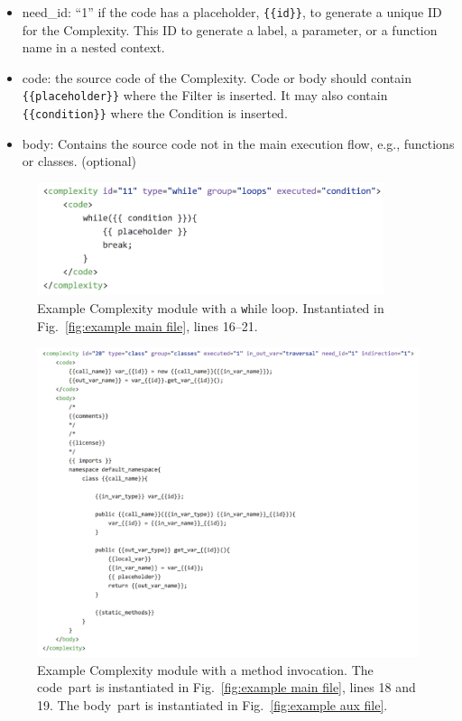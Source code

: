 \documentclass[12pt]{article}
\begin{document}
\begin{itemize}
    \item need\_id: ``1'' if the code has a placeholder, \verb|{{id}}|,
    to generate a unique ID for the Complexity.  This ID to generate 
    a label, a parameter, or a function name in a nested
    context.

    \item code: the source code of the Complexity.  Code or 
    body should contain \\ \verb|{{placeholder}}|
    where the Filter is inserted.  It may also contain
    \verb|{{condition}}| where the Condition
    is inserted.

    \item body:  Contains the source code not in the main execution 
    flow, e.g., 
    functions or classes. (optional)
\end{itemize}


\begin{figure}[htbp]
  \includegraphics[width=4in]{fig_Complexity_file_while.png}
  \caption{Example Complexity module with a {\texttt while} loop.  Instantiated in 
    Fig.~\ref{fig:example main file}, lines 16--21.}
  \label{fig:example complexity-while file}
\end{figure}

\begin{figure}[htbp]
  \includegraphics[width=\linewidth]{fig_Complexity_file_method.png}
  \caption{Example Complexity module with a method invocation.  
  The \texlangle code\texrangle\  part is instantiated in
  Fig.~\ref{fig:example main file}, lines 18 and 19. 
  The \texlangle body\texrangle\  part is instantiated in
  Fig.~\ref{fig:example aux file}.}
  \label{fig:example complexity-method file}
\end{figure}
\end{document}
